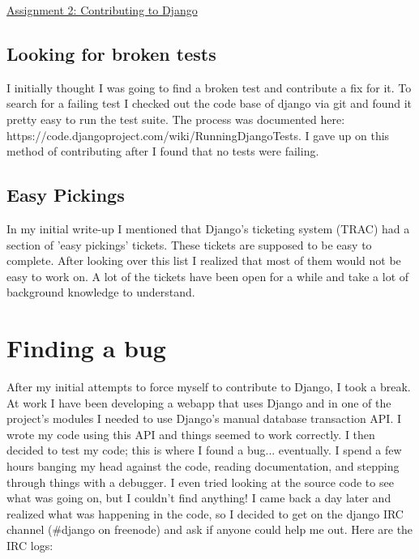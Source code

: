 \documentclass[12pt]{article}
\def\title{Assignment 2: Contributing to Django}
\begin{document}
\begin{center}
\underline{
\large{\title}
}
\end{center}
\singlespacing

\subsection{Looking for broken tests}
I initially thought I was going to find a broken test and contribute a fix for
it. To search for a failing test I checked out the code base of django via git
and found it pretty easy to run the test suite. The process was documented
here: https://code.djangoproject.com/wiki/RunningDjangoTests. I gave up on this
method of contributing after I found that no tests were failing.

\subsection{Easy Pickings}
In my initial write-up I mentioned that Django's ticketing system (TRAC) had a
section of 'easy pickings' tickets. These tickets are supposed to be easy to
complete. After looking over this list I realized that most of them would not
be easy to work on. A lot of the tickets have been open for a while and take a
lot of background knowledge to understand.

\section{Finding a bug}
After my initial attempts to force myself to contribute to Django, I took a
break. At work I have been developing a webapp that uses
Django and in one of the project's modules I needed to use Django's manual
database transaction API.  I wrote my code using this API and things seemed to
work correctly. I then decided to test my code; this is where I found a bug...
eventually. I spend a few hours banging my head against the code, reading
documentation, and stepping through things with a debugger. I even tried
looking at the source code to see what was going on, but I couldn't find
anything! I came back a day later and realized what was happening in the code,
so I decided to get on the django IRC channel (\#django on freenode) and ask
if anyone could help me out. Here are the IRC logs:
\end{document}
